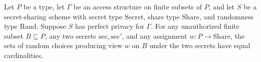 \begin{theorem}
\label{TCSlib.SecretSharing.Scheme.PerfectPrivacy.card_view_eq}
\leanok
{}
Let $P$ be a type, let $\Gamma$ be an access structure on finite subsets of $P$, and let
$S$ be a secret-sharing scheme with secret type $\mathrm{Secret}$, share type
$\mathrm{Share}$, and randomness type $\mathrm{Rand}$. Suppose $S$ has perfect privacy
for $\Gamma$. For any unauthorized finite subset $B\subseteq P$, any two secrets
$\mathrm{sec},\mathrm{sec}'$, and any assignment $w:P\to\mathrm{Share}$, the sets of
random choices producing view $w$ on $B$ under the two secrets have equal cardinalities.
\end{theorem}

